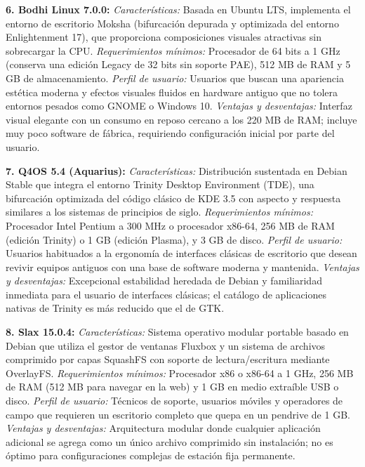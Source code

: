 \documentclass[12pt]{article}
\begin{document}
\smallskip
\noindent\textbf{6. Bodhi Linux 7.0.0:}
\textit{Características:} Basada en Ubuntu LTS, implementa el entorno de escritorio Moksha (bifurcación depurada y optimizada del entorno Enlightenment 17), que proporciona composiciones visuales atractivas sin sobrecargar la CPU.
\textit{Requerimientos mínimos:} Procesador de 64 bits a 1 GHz (conserva una edición Legacy de 32 bits sin soporte PAE), 512 MB de RAM y 5 GB de almacenamiento.
\textit{Perfil de usuario:} Usuarios que buscan una apariencia estética moderna y efectos visuales fluidos en hardware antiguo que no tolera entornos pesados como GNOME o Windows 10.
\textit{Ventajas y desventajas:} Interfaz visual elegante con un consumo en reposo cercano a los 220 MB de RAM; incluye muy poco software de fábrica, requiriendo configuración inicial por parte del usuario.

\smallskip
\noindent\textbf{7. Q4OS 5.4 (Aquarius):}
\textit{Características:} Distribución sustentada en Debian Stable que integra el entorno Trinity Desktop Environment (TDE), una bifurcación optimizada del código clásico de KDE 3.5 con aspecto y respuesta similares a los sistemas de principios de siglo.
\textit{Requerimientos mínimos:} Procesador Intel Pentium a 300 MHz o procesador x86-64, 256 MB de RAM (edición Trinity) o 1 GB (edición Plasma), y 3 GB de disco.
\textit{Perfil de usuario:} Usuarios habituados a la ergonomía de interfaces clásicas de escritorio que desean revivir equipos antiguos con una base de software moderna y mantenida.
\textit{Ventajas y desventajas:} Excepcional estabilidad heredada de Debian y familiaridad inmediata para el usuario de interfaces clásicas; el catálogo de aplicaciones nativas de Trinity es más reducido que el de GTK.

\smallskip
\noindent\textbf{8. Slax 15.0.4:}
\textit{Características:} Sistema operativo modular portable basado en Debian que utiliza el gestor de ventanas Fluxbox y un sistema de archivos comprimido por capas SquashFS con soporte de lectura/escritura mediante OverlayFS.
\textit{Requerimientos mínimos:} Procesador x86 o x86-64 a 1 GHz, 256 MB de RAM (512 MB para navegar en la web) y 1 GB en medio extraíble USB o disco.
\textit{Perfil de usuario:} Técnicos de soporte, usuarios móviles y operadores de campo que requieren un escritorio completo que quepa en un pendrive de 1 GB.
\textit{Ventajas y desventajas:} Arquitectura modular donde cualquier aplicación adicional se agrega como un único archivo comprimido sin instalación; no es óptimo para configuraciones complejas de estación fija permanente.
\end{document}
